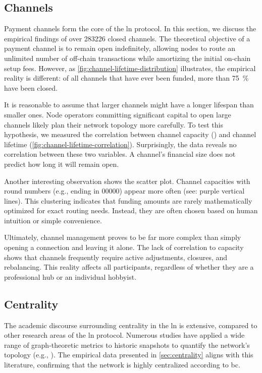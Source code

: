 \subsection{Channels}

Payment channels form the core of the \gls{ln} protocol. 
In this section, we discuss the empirical findings of over \num{283226} closed channels.
The theoretical objective of a payment channel is to remain open indefinitely, 
allowing nodes to route an unlimited number of off-chain transactions while 
amortizing the initial on-chain setup fees. 
However, as \autoref{fig:channel-lifetime-distribution} illustrates, 
the empirical reality is different: of all channels that have ever been funded, 
more than \qty{75}{\percent} have been closed.

It is reasonable to assume that larger channels might have a longer lifespan than smaller ones. 
Node operators committing significant capital to open large channels 
likely plan their network topology more carefully. 
To test this hypothesis, we measured the correlation between channel capacity () 
and channel lifetime (\autoref{fig:channel-lifetime-correlation}).
Surprisingly, the data reveals no correlation between these two variables. 
A channel's financial size does not predict how long it will remain open.

Another interesting observation shows the scatter plot. 
Channel capacities with round numbers (e.g.,  ending in $00000$) appear more often (see: purple vertical lines). 
This clustering indicates that funding amounts are rarely mathematically optimized for exact routing needs. 
Instead, they are often chosen based on human intuition or simple convenience.

Ultimately, channel management proves to be far more complex than 
simply opening a connection and leaving it alone. 
The lack of correlation to capacity shows that channels frequently require active adjustments, closures, and rebalancing. 
This reality affects all participants, regardless of whether they are a professional hub or an individual hobbyist.


\subsection{Centrality}

The academic discourse surrounding centrality in the \gls{ln} is extensive, 
compared to other research areas of the \gls{ln} protocol. 
Numerous studies have applied a wide range of graph-theoretic metrics 
to historic snapshots to quantify the network's topology (e.g., \cite{atmanaviciute_quantitative_2025}). 
The empirical data presented in \autoref{sec:centrality} aligns with this literature, 
confirming that the network is highly centralized according to \gls{bc}.

